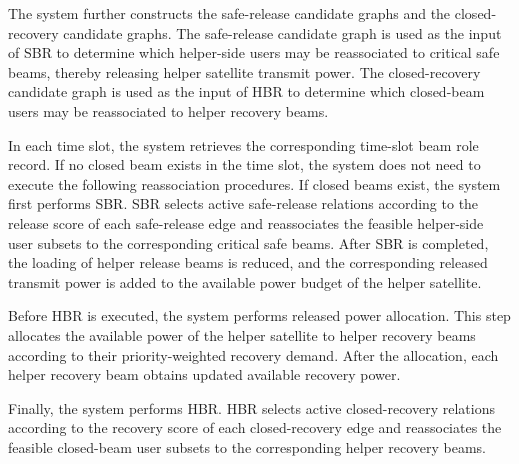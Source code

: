 The system further constructs the safe-release candidate graphs and the closed-recovery candidate graphs. The safe-release candidate graph is used as the input of SBR to determine which helper-side users may be reassociated to critical safe beams, thereby releasing helper satellite transmit power. The closed-recovery candidate graph is used as the input of HBR to determine which closed-beam users may be reassociated to helper recovery beams.

In each time slot, the system retrieves the corresponding time-slot beam role record. If no closed beam exists in the time slot, the system does not need to execute the following reassociation procedures. If closed beams exist, the system first performs SBR. SBR selects active safe-release relations according to the release score of each safe-release edge and reassociates the feasible helper-side user subsets to the corresponding critical safe beams. After SBR is completed, the loading of helper release beams is reduced, and the corresponding released transmit power is added to the available power budget of the helper satellite.

Before HBR is executed, the system performs released power allocation. This step allocates the available power of the helper satellite to helper recovery beams according to their priority-weighted recovery demand. After the allocation, each helper recovery beam obtains updated available recovery power.

Finally, the system performs HBR. HBR selects active closed-recovery relations according to the recovery score of each closed-recovery edge and reassociates the feasible closed-beam user subsets to the corresponding helper recovery beams.

